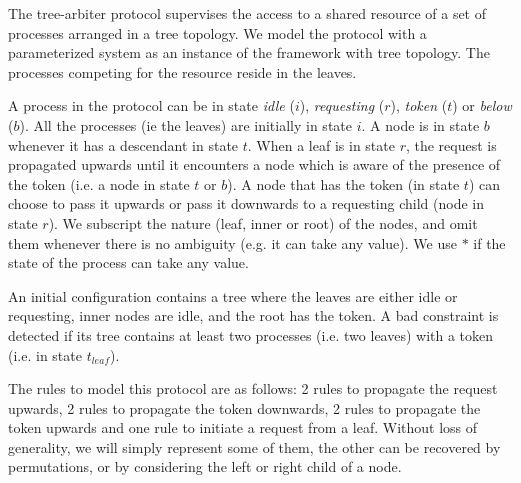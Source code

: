 %
The tree-arbiter protocol supervises the access to a shared resource
of a set of processes arranged in a tree topology.
%
We model the protocol with a parameterized system as an instance of
the framework with tree topology. The processes competing for the
resource reside in the leaves.

A process in the protocol can be in state \emph{idle} ($i$),
\emph{requesting} ($r$), \emph{token} ($t$) or \emph{below} ($b$). All
the processes (ie the leaves) are initially in state $i$.  A node is in state $b$
whenever it has a descendant in state $t$.  When a leaf is in state
$r$, the request is propagated upwards until it encounters a node
which is aware of the presence of the token (i.e. a node in state $t$
or $b$).  A node that has the token (in state $t$) can choose to pass
it upwards or pass it downwards to a requesting child (node in state
$r$).
%
We subscript the nature (leaf, inner or root) of the nodes, and omit
them whenever there is no ambiguity (e.g. it can take any value). We
use $*$ if the state of the process can take any value.

An initial configuration contains a tree where the leaves are either
idle or requesting, inner nodes are idle, and the root has the
token. A bad constraint is detected if its tree contains at least two
processes (i.e. two leaves) with a token (i.e. in state $t_{leaf}$).

The rules to model this protocol are as follows: 
%
2 rules to propagate the request upwards, 
%
2 rules to propagate the token downwards, 
%
2 rules to propagate the token upwards and one rule to initiate a request from a leaf. 
%
Without loss of generality, we will simply represent some of them, the
other can be recovered by permutations, or by considering the left or
right child of a node.

